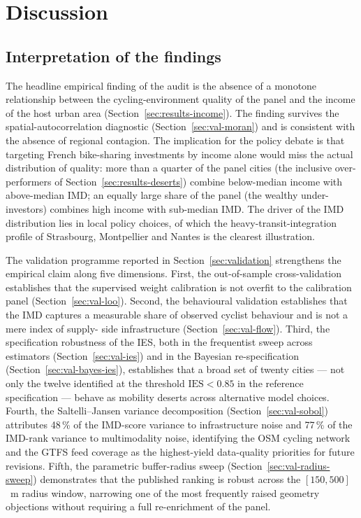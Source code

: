 \documentclass[11pt,a4paper]{article}
\newcommand{\IES}{\mathrm{IES}}
\begin{document}
\section{Discussion}
\label{sec:discussion}

\subsection{Interpretation of the findings}

The headline empirical finding of the audit is the absence of a
monotone relationship between the cycling-environment quality of
the panel and the income of the host urban area
(Section~\ref{sec:results-income}). The finding survives the
spatial-autocorrelation diagnostic (Section~\ref{sec:val-moran})
and is consistent with the absence of regional contagion. The
implication for the policy debate is that targeting French
bike-sharing investments by income alone would miss the actual
distribution of quality: more than a quarter of the panel cities
(the inclusive over-performers of Section~\ref{sec:results-deserts})
combine below-median income with above-median IMD; an equally
large share of the panel (the wealthy under-investors) combines
high income with sub-median IMD. The driver of the IMD
distribution lies in local policy choices, of which the
heavy-transit-integration profile of Strasbourg, Montpellier and
Nantes is the clearest illustration.

The validation programme reported in Section~\ref{sec:validation}
strengthens the empirical claim along five dimensions. First,
the out-of-sample cross-validation establishes that the
supervised weight calibration is not overfit to the calibration
panel (Section~\ref{sec:val-loo}). Second, the behavioural
validation establishes that the IMD captures a measurable share
of observed cyclist behaviour and is not a mere index of supply-
side infrastructure (Section~\ref{sec:val-flow}). Third, the
specification robustness of the IES, both in the frequentist
sweep across estimators (Section~\ref{sec:val-ies}) and in the
Bayesian re-specification (Section~\ref{sec:val-bayes-ies}),
establishes that a broad set of twenty cities --- not only the
twelve identified at the threshold $\IES < 0.85$ in the reference
specification --- behave as mobility deserts across alternative
model choices. Fourth, the Saltelli--Jansen variance
decomposition (Section~\ref{sec:val-sobol}) attributes 48\,\% of
the IMD-score variance to infrastructure noise and 77\,\% of the
IMD-rank variance to multimodality noise, identifying the OSM
cycling network and the GTFS feed coverage as the highest-yield
data-quality priorities for future revisions. Fifth, the
parametric buffer-radius sweep (Section~\ref{sec:val-radius-sweep})
demonstrates that the published ranking is robust across the
$[150, 500]$~m radius window, narrowing one of the most
frequently raised geometry objections without requiring a full
re-enrichment of the panel.
\end{document}
